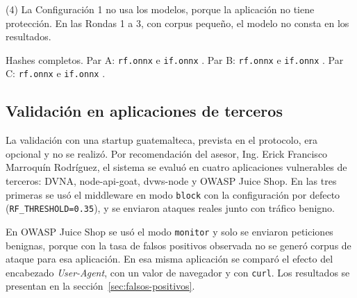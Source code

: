 \footnotesize (4) La Configuración 1 no usa los modelos, porque la aplicación no tiene protección. En las Rondas 1 a 3, con corpus pequeño, el modelo no consta en los resultados.

Hashes completos. Par A: \texttt{rf.onnx} \texttt{} e \texttt{if.onnx} \texttt{}. Par B: \texttt{rf.onnx} \texttt{} e \texttt{if.onnx} \texttt{}. Par C: \texttt{rf.onnx} \texttt{} e \texttt{if.onnx} \texttt{}.

\subsection{Validación en aplicaciones de terceros}\label{sec:validacion-terceros}

La validación con una startup guatemalteca, prevista en el protocolo, era opcional y no se realizó. Por recomendación del asesor, Ing. Erick Francisco Marroquín Rodríguez, el sistema se evaluó en cuatro aplicaciones vulnerables de terceros: DVNA, node-api-goat, dvws-node y OWASP Juice Shop. En las tres primeras se usó el middleware en modo \texttt{block} con la configuración por defecto (\texttt{RF\_THRESHOLD=0.35}), y se enviaron ataques reales junto con tráfico benigno.

En OWASP Juice Shop se usó el modo \texttt{monitor} y solo se enviaron peticiones benignas, porque con la tasa de falsos positivos observada no se generó corpus de ataque para esa aplicación. En esa misma aplicación se comparó el efecto del encabezado \textit{User-Agent}, con un valor de navegador y con \texttt{curl}. Los resultados se presentan en la sección~\ref{sec:falsos-positivos}.

